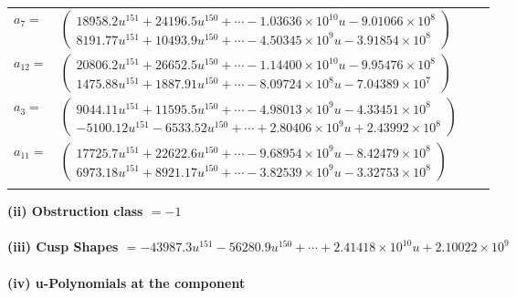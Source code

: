 \documentclass[1p]{elsarticle_modified}
\theoremstyle{definition}
\begin{document}
\begin{tabular}{m{7pt} m{180pt} m{7pt} m{180pt} }
\flushright $a_{7}=$&$\begin{pmatrix}18958.2 u^{151}+24196.5 u^{150}+\cdots-1.03636\times10^{10} u-9.01066\times10^{8}\\8191.77 u^{151}+10493.9 u^{150}+\cdots-4.50345\times10^{9} u-3.91854\times10^{8}\end{pmatrix}$ \\
\flushright $a_{12}=$&$\begin{pmatrix}20806.2 u^{151}+26652.5 u^{150}+\cdots-1.14400\times10^{10} u-9.95476\times10^{8}\\1475.88 u^{151}+1887.91 u^{150}+\cdots-8.09724\times10^{8} u-7.04389\times10^{7}\end{pmatrix}$ \\
\flushright $a_{3}=$&$\begin{pmatrix}9044.11 u^{151}+11595.5 u^{150}+\cdots-4.98013\times10^{9} u-4.33451\times10^{8}\\-5100.12 u^{151}-6533.52 u^{150}+\cdots+2.80406\times10^{9} u+2.43992\times10^{8}\end{pmatrix}$ \\
\flushright $a_{11}=$&$\begin{pmatrix}17725.7 u^{151}+22622.6 u^{150}+\cdots-9.68954\times10^{9} u-8.42479\times10^{8}\\6973.18 u^{151}+8921.17 u^{150}+\cdots-3.82539\times10^{9} u-3.32753\times10^{8}\end{pmatrix}$\\&\end{tabular}
\flushleft \textbf{(ii) Obstruction class $= -1$}\\~\\
\flushleft \textbf{(iii) Cusp Shapes $= -43987.3 u^{151}-56280.9 u^{150}+\cdots+2.41418\times10^{10} u+2.10022\times10^{9}$}\\~\\
\newpage\renewcommand{\arraystretch}{1}
\flushleft \textbf{(iv) u-Polynomials at the component}\newline \\
\end{document}
